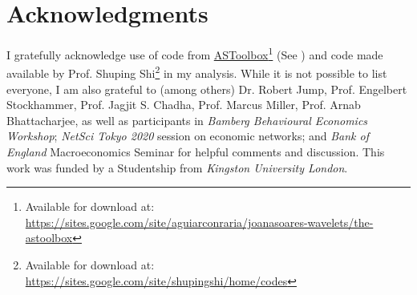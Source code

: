 \documentclass[11pt]{article}
\begin{document}
\section{Acknowledgments}
I gratefully acknowledge use of code from \href{https://sites.google.com/site/aguiarconraria/joanasoares-wavelets/the-astoolbox}{ASToolbox}\footnote{Available for download at: \url{https://sites.google.com/site/aguiarconraria/joanasoares-wavelets/the-astoolbox}} (See \cite{Aguiar-Conraria2014}) and code made available by Prof. Shuping Shi\footnote{Available for download at: \url{https://sites.google.com/site/shupingshi/home/codes}} in my analysis. While it is not possible to list everyone, I am also grateful to (among others) Dr. Robert Jump, Prof. Engelbert Stockhammer, Prof. Jagjit S. Chadha, Prof. Marcus Miller, Prof. Arnab Bhattacharjee, as well as participants in \textit{Bamberg Behavioural Economics Workshop}; \textit{NetSci Tokyo 2020} session on economic networks; and \textit{Bank of England} Macroeconomics Seminar for helpful comments and discussion. This work was funded by a Studentship from \textit{Kingston University London}.





%
%

%
%



\clearpage
\end{document}
